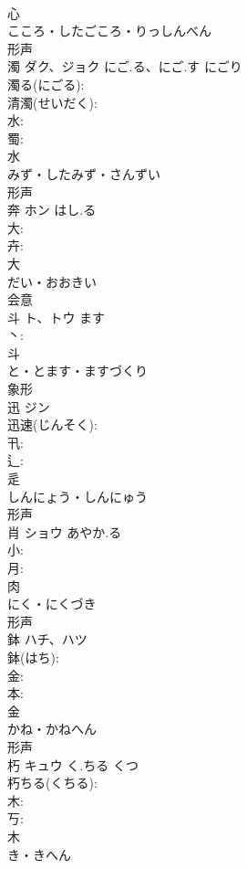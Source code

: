 \documentclass[8pt]{extreport}
\begin{document}
\begin{CJK}{UTF8}{min}
\\	心	
\\	こころ・したごころ・りっしんべん	
\\	形声 
\\	濁	ダク、ジョク	にご.る、にご.す	にごり	
\\	濁る(にごる): 
\\	清濁(せいだく): 
\\	水: 
\\	蜀: 
\\	水	
\\	みず・したみず・さんずい	
\\	形声 
\\	奔	ホン	はし.る		
\\	大: 
\\	卉: 
\\	大	
\\	だい・おおきい	
\\	会意 
\\	斗	ト、トウ		ます	
\\	丶: 
\\	斗	
\\	と・とます・ますづくり	
\\	象形 
\\	迅	ジン			
\\	迅速(じんそく): 
\\	卂: 
\\	辶: 
\\	辵	
\\	しんにょう・しんにゅう	
\\	形声 
\\	肖	ショウ	あやか.る		
\\	小: 
\\	月: 
\\	肉	
\\	にく・にくづき	
\\	形声 
\\	鉢	ハチ、ハツ			
\\	鉢(はち): 
\\	金: 
\\	本: 
\\	金	
\\	かね・かねへん	
\\	形声 
\\	朽	キュウ	く.ちる	くつ	
\\	朽ちる(くちる): 
\\	木: 
\\	丂: 
\\	木	
\\	き・きへん	

\end{CJK}
\end{document}
